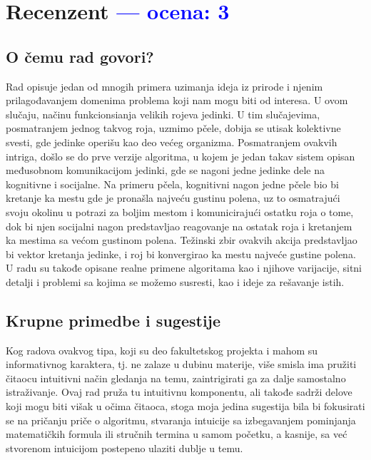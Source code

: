 \documentclass[a4paper]{report}
\newcommand{\odgovor}[1]{\textcolor{blue}{#1}}
\begin{document}
\chapter{Recenzent \odgovor{--- ocena: 3} }


\section{O čemu rad govori?}
Rad opisuje jedan od mnogih primera uzimanja ideja iz prirode i njenim prilagođavanjem domenima problema koji nam mogu biti od interesa. U ovom slučaju, 
načinu funkcionsianja velikih rojeva jedinki. U tim slučajevima, posmatranjem jednog takvog roja, uzmimo pčele, dobija se utisak kolektivne svesti, 
gde jedinke operišu kao deo većeg organizma. Posmatranjem ovakvih intriga, došlo se do prve verzije algoritma, u kojem je jedan takav sistem opisan 
međusobnom komunikacijom jedinki, gde se nagoni jedne jedinke dele na kognitivne i socijalne. Na primeru pčela, kognitivni nagon jedne pčele bio bi  
kretanje ka mestu gde je pronašla najveću gustinu polena, uz to osmatrajući svoju okolinu u potrazi za boljim mestom i komunicirajući ostatku roja o tome, 
dok bi njen socijalni nagon predstavljao reagovanje na ostatak roja i kretanjem ka mestima sa većom gustinom polena. Težinski zbir ovakvih akcija 
predstavljao bi vektor kretanja jedinke, i roj bi konvergirao ka mestu najveće gustine polena. U radu su takođe opisane realne primene algoritama 
kao i njihove varijacije, sitni detalji i problemi sa kojima se možemo susresti, kao i ideje za rešavanje istih. 

\section{Krupne primedbe i sugestije}
Kog radova ovakvog tipa, koji su deo fakultetskog projekta i mahom su informativnog karaktera, tj. ne zalaze u dubinu materije, više smisla ima 
pružiti čitaocu intuitivni način gledanja na temu, zaintrigirati ga za dalje samostalno istraživanje. Ovaj rad pruža tu intuitivnu komponentu, ali 
takođe sadrži delove koji mogu biti višak u očima čitaoca, stoga moja jedina sugestija bila bi fokusirati se na pričanju priče o algoritmu, 
stvaranja intuicije sa izbegavanjem pominjanja matematičkih formula ili stručnih termina u samom početku, a kasnije, sa već stvorenom intuicijom postepeno 
ulaziti dublje u temu.
\end{document}
